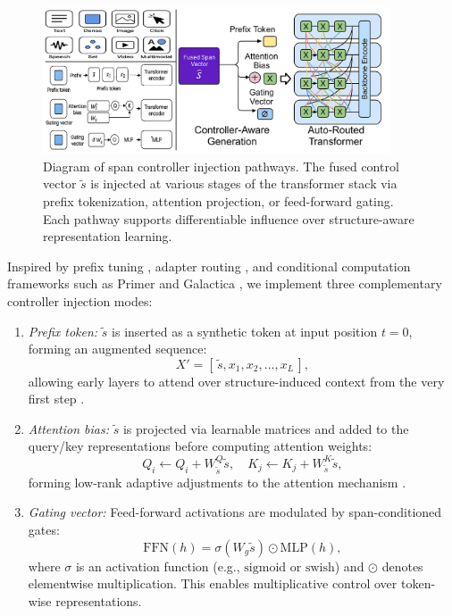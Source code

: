 \begin{figure}[H]
  \centering
  \includegraphics[width=0.92\textwidth]{figures/figure_5.png}
  \caption{Diagram of span controller injection pathways. The fused control vector \(\tilde{s}\) is injected at various stages of the transformer stack via prefix tokenization, attention projection, or feed-forward gating. Each pathway supports differentiable influence over structure-aware representation learning.}
  \label{fig:controller_injection_modes}
\end{figure}

Inspired by prefix tuning \cite{li2021prefix}, adapter routing \cite{hu2021lora}, and conditional computation frameworks such as Primer \cite{dai2022primer} and Galactica \cite{taylor2022galactica}, we implement three complementary controller injection modes:

\begin{enumerate}[label=(\alph*)]
  \item \emph{Prefix token:} \(\tilde{s}\) is inserted as a synthetic token at input position \(t = 0\), forming an augmented sequence:
  \[
  X' = [\,\tilde{s}, x_1, x_2, \dots, x_L\,],
  \]
  allowing early layers to attend over structure-induced context from the very first step \cite{li2021prefix}.

  \item \emph{Attention bias:} \(\tilde{s}\) is projected via learnable matrices and added to the query/key representations before computing attention weights:
  \[
  Q_i \leftarrow Q_i + W^Q_{\tilde{s}} \tilde{s}, \quad
  K_j \leftarrow K_j + W^K_{\tilde{s}} \tilde{s},
  \]
  forming low-rank adaptive adjustments to the attention mechanism \cite{hu2021lora}.

  \item \emph{Gating vector:} Feed-forward activations are modulated by span-conditioned gates:
  \[
  \mathrm{FFN}(h) = \sigma(W_g \tilde{s}) \odot \mathrm{MLP}(h),
  \]
  where \(\sigma\) is an activation function (e.g., \(\mathrm{sigmoid}\) or \(\mathrm{swish}\)) and \(\odot\) denotes elementwise multiplication. This enables multiplicative control over token-wise representations.
\end{enumerate}

